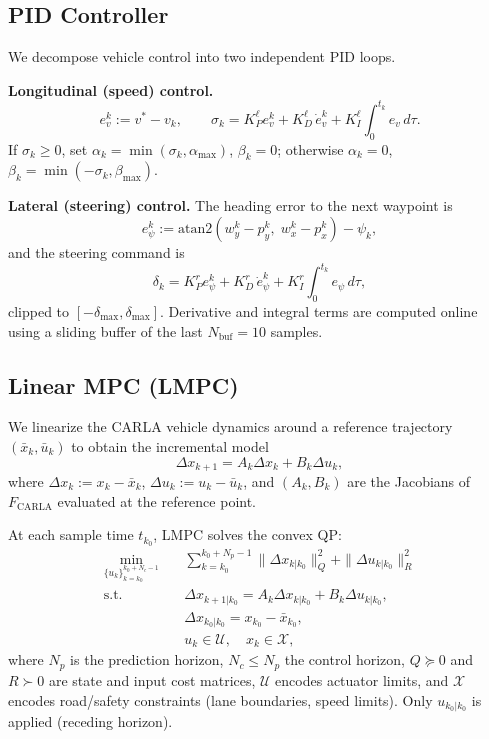 \documentclass[conference]{IEEEtran}
\begin{document}
\subsection{PID Controller}

We decompose vehicle control into two independent PID loops.

\noindent\textbf{Longitudinal (speed) control.}
\begin{equation}\label{eq:pid_lon}
  e_v^k := v^* - v_k, \qquad
  \sigma_k = K_P^{\ell} e_v^k + K_D^{\ell}\,\dot{e}_v^k +
  K_I^{\ell}\int_0^{t_k} e_v \,d\tau.
\end{equation}
If $\sigma_k \geq 0$, set $\alpha_k = \min(\sigma_k, \alpha_{\max})$,
$\beta_k = 0$; otherwise $\alpha_k = 0$, $\beta_k = \min(-\sigma_k,
\beta_{\max})$.

\noindent\textbf{Lateral (steering) control.}  The heading error to the
next waypoint is
\begin{equation}\label{eq:heading_err}
  e_\psi^k := \mathrm{atan2}(w_y^k - p_y^k,\;w_x^k - p_x^k) - \psi_k,
\end{equation}
and the steering command is
\begin{equation}\label{eq:pid_lat}
  \delta_k = K_P^{r} e_\psi^k + K_D^{r}\,\dot{e}_\psi^k +
  K_I^{r}\int_0^{t_k} e_\psi \,d\tau,
\end{equation}
clipped to $[-\delta_{\max}, \delta_{\max}]$.  Derivative and integral
terms are computed online using a sliding buffer of the last
$N_{\mathrm{buf}} = 10$ samples.

\subsection{Linear MPC (LMPC)}

We linearize the CARLA vehicle dynamics around a reference trajectory
$(\bar{x}_k, \bar{u}_k)$ to obtain the incremental model
\begin{equation}\label{eq:lmpc_model}
  \Delta x_{k+1} = A_k \Delta x_k + B_k \Delta u_k,
\end{equation}
where $\Delta x_k := x_k - \bar{x}_k$, $\Delta u_k := u_k -
\bar{u}_k$, and $(A_k, B_k)$ are the Jacobians of
$F_{\mathrm{CARLA}}$ evaluated at the reference point.

At each sample time $t_{k_0}$, LMPC solves the convex QP:
\begin{align}
  \min_{\{u_k\}_{k=k_0}^{k_0+N_c-1}} \quad&
    \sum_{k=k_0}^{k_0+N_p-1}\!\!\|\Delta x_{k|k_0}\|_Q^2
    + \|\Delta u_{k|k_0}\|_R^2 \label{eq:lmpc_cost}\\
  \mathrm{s.t.}\quad & \Delta x_{k+1|k_0} = A_k\Delta x_{k|k_0} +
    B_k \Delta u_{k|k_0}, \nonumber\\
  & \Delta x_{k_0|k_0} = x_{k_0} - \bar{x}_{k_0},\nonumber\\
  & u_k \in \mathcal{U},\quad x_k \in \mathcal{X}, \nonumber
\end{align}
where $N_p$ is the prediction horizon, $N_c \leq N_p$ the control
horizon, $Q \succeq 0$ and $R \succ 0$ are state and input cost
matrices, $\mathcal{U}$ encodes actuator limits, and $\mathcal{X}$
encodes road/safety constraints (lane boundaries, speed limits).  Only
$u_{k_0|k_0}$ is applied (receding horizon).
\end{document}
